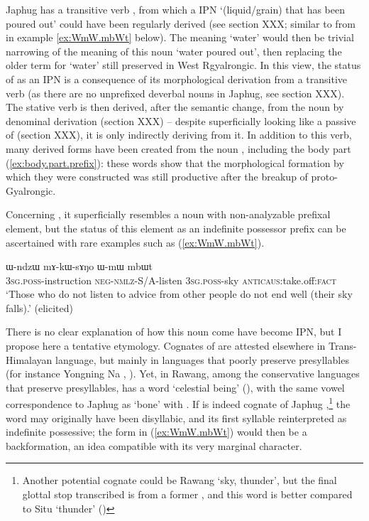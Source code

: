 Japhug has a transitive verb , from which a IPN  `(liquid/grain) that has been poured out' could have been regularly derived (see section XXX; similar to  from  in example \ref{ex:WmW.mbWt} below). The meaning `water' would then be trivial narrowing of the meaning of this noun `water poured out', then replacing the older term for `water' still preserved in West Rgyalrongic. In this view, the status of   as an IPN is a consequence of its morphological derivation from a transitive verb (as there are no unprefixed deverbal nouns in Japhug, see section XXX). The stative verb  is then derived, after the semantic change, from the noun   by denominal derivation (section XXX) -- despite superficially looking like a passive of  (section XXX), it is only indirectly deriving from it. In addition to this verb, many derived forms have been created from the noun  , including the body part  (\ref{ex:body.part.prefix}): these words show that the morphological formation by which they were constructed was still productive after the breakup of proto-Gyalrongic.


Concerning , it superficially resembles a noun with non-analyzable  prefixal element, but the status of this element as an indefinite possessor prefix can be ascertained with rare examples such as (\ref{ex:WmW.mbWt}).

\begin{exe}
\ex  \label{ex:WmW.mbWt}
\gll  ɯ-ndzɯ mɤ-kɯ-sɤŋo ɯ-mɯ mbɯt  \\
\textsc{3sg.poss}-instruction \textsc{neg}-\textsc{nmlz}-S/A-listen \textsc{3sg.poss}-sky \textsc{anticaus}:take.off:\textsc{fact} \\
\glt `Those who do not listen to advice from other people do not end well (their sky falls).' (elicited)
\end{exe}
There is no clear explanation of how this noun come have become IPN, but I propose here a tentative etymology. Cognates of  are attested elsewhere in Trans-Himalayan language, but mainly in languages that poorly preserve presyllables (for instance Yongning Na , \citealt[132]{michaud17yongning}). Yet, in Rawang, among the conservative languages that preserve presyllables, has a word   `celestial being'  (\citealt[13]{lapolla01rawang}), with the same vowel correspondence to Japhug  as   `bone' with . If   is indeed cognate of Japhug ,\footnote{Another potential cognate could be Rawang   `sky, thunder', but the final glottal stop transcribed  is from a former , and this word is better compared to Situ  `thunder' (\citealt[73]{zhang16bragdbar})} the word may originally have been disyllabic, and its first syllable reinterpreted as indefinite possessive; the form  in (\ref{ex:WmW.mbWt}) would then be a backformation, an idea compatible with its very marginal character.

